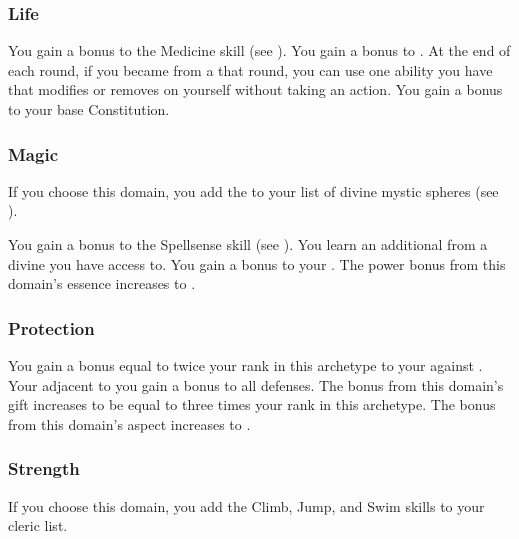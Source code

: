         \subsubsection{Life}
             You gain a  bonus to the Medicine skill (see ).
             You gain a  bonus to .
             At the end of each round, if you became  from a  that round, you can use one  ability you have that modifies  or removes  on yourself without taking an action.
             You gain a  bonus to your base Constitution.

        \subsubsection{Magic}
            If you choose this domain, you add the   to your list of divine mystic spheres (see ).

             You gain a  bonus to the Spellsense skill (see ).
             You learn an additional  from a divine  you have access to.
             You gain a  bonus to your  .
             The power bonus from this domain's essence increases to .

        \subsubsection{Protection}
             You gain a bonus equal to twice your rank in this archetype to your  against .
             Your  adjacent to you gain a  bonus to all defenses.
             The bonus from this domain's gift increases to be equal to three times your rank in this archetype.
             The bonus from this domain's aspect increases to .

        \subsubsection{Strength}
            If you choose this domain, you add the Climb, Jump, and Swim skills to your cleric  list.


